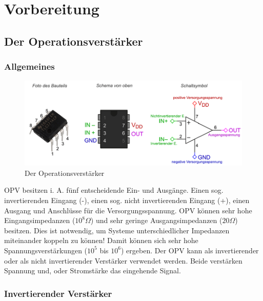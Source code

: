 \chapter{Vorbereitung}
\section{Der Operationsverstärker}
\subsection{Allgemeines}

\begin{figure}[H]
     \centering
     \includegraphics[width=1\textwidth]{Abb/opamp.pdf}
     \caption{Der Operationsverstärker}
     \label{opamp}
\end{figure}
OPV besitzen i. A. fünf entscheidende Ein- und Ausgänge. Einen sog. invertierenden Eingang (-), einen sog. nicht invertierenden Eingang (+), einen Ausgang und Anschlüsse für die Versorgungsspannung.
OPV können sehr hohe Eingangsimpedanzen ($10^{8} \Omega$) und sehr geringe Ausgangsimpedanzen ($20 \Omega$) besitzen. Dies ist notwendig, um Systeme unterschiedlicher Impedanzen miteinander koppeln zu können! Damit können sich sehr hohe Spannungsverstärkungen ($10^{5}$ bis $10^{6}$) ergeben.
Der OPV kann als invertierender oder als nicht invertierender Verstärker verwendet werden. Beide verstärken Spannung und, oder Stromstärke das eingehende Signal.

\subsection{Invertierender Verstärker}

